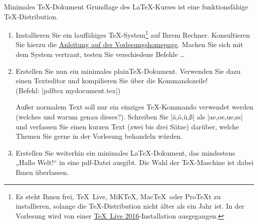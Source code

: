 \documentclass[
	blattnr=0,
	ausgabe=2016-10-21,
	abgabe=2016-10-28,
	lösung,
	shortverb,
]{../tex/latexkurs-exercise}
\begin{document}
\begin{abstract}
	\noindent Achtung: Da die Installation der \TeX-Distribution grundlegend für den Kurs ist,
	muss die Abgabe für dieses Blatt von jedem einzeln bearbeitet werden. \\
	\emph{Keine Gruppenabgabe!}
\end{abstract}

\begin{aufgabe}[12]{Minimales \TeX-Dokument}
	Grundlage des \LaTeX-Kurses ist eine funktionsfähige \TeX-Distribution. 
	\begin{enumerate}[label=\alph*)]
		\item Installieren Sie ein lauffähiges \TeX-System\footnote{ Es steht Ihnen frei, \TeX~Live, MiK\TeX, Mac\TeX~oder Pro\TeX t zu installieren, solange die \TeX-Distribution nicht älter als ein Jahr ist. In der Vorlesung wird von einer \href{http://www.tug.org/texlive/}{\TeX~Live 2016}-Installation ausgegangen.} auf Ihrem Rechner. Konsultieren Sie hierzu die \href{http://latexkurs.github.io/exercises/00_texlive_installation.pdf}{Anleitung auf der Vorlesungshomepage}. Machen Sie sich mit dem System vertraut, testen Sie verschiedene Befehle …

		\item \label{aufg:texdoc} Erstellen Sie nun ein minimales plain\TeX-Dokument. Verwenden Sie dazu einen Texteditor und kompilieren Sie über die Kommandozeile! \\(Befehl: |pdftex mydocument.tex|)

		Außer normalem Text soll nur ein einziges \TeX-Kommando verwendet werden (welches und warum genau dieses?). Schreiben Sie |ä,ö,ü,ß| als |ae,oe,ue,ss| und verfassen Sie einen kurzen Text (zwei bis drei Sätze) darüber, welche Themen Sie gerne in der Vorlesung behandeln würden.

		\item \label{aufg:latexdoc} Erstellen Sie weiterhin ein minimales \LaTeX-Dokument, das mindestens „Hallo Welt!“ in eine pdf-Datei ausgibt. Die Wahl der \TeX-Maschine ist dabei Ihnen überlassen.
	\end{enumerate}
\end{aufgabe}


\end{document}
